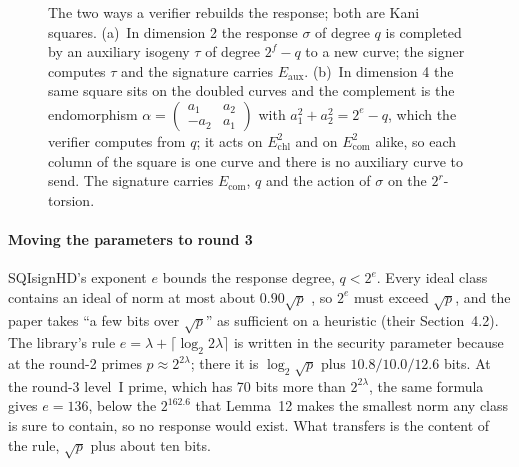 \documentclass[11pt]{article}
\newcommand{\Ecom}{E_{\mathrm{com}}}
\newcommand{\Echl}{E_{\mathrm{chl}}}
\newcommand{\Eaux}{E_{\mathrm{aux}}}
\begin{document}
\begin{figure}[htbp]
\caption{The two ways a verifier rebuilds the response; both are Kani
squares.  (a)~In dimension 2 the response $\sigma$ of degree $q$ is
completed by an auxiliary isogeny $\tau$ of degree $2^f - q$ to a new
curve; the signer computes $\tau$ and the signature carries $\Eaux$.
(b)~In dimension 4 the same square sits on the doubled curves and the
complement is the endomorphism $\alpha = \left(\begin{smallmatrix} a_1 &
a_2 \\ -a_2 & a_1 \end{smallmatrix}\right)$ with $a_1^2 + a_2^2 = 2^e -
q$, which the verifier computes from $q$; it acts on $\Echl^2$ and on
$\Ecom^2$ alike, so each column of the square is one curve and there is
no auxiliary curve to send.  The signature carries $\Ecom$, $q$ and the
action of $\sigma$ on the $2^r$-torsion.}
\label{fig:idea}
\end{figure}

\paragraph{Moving the parameters to round 3}
SQIsignHD's exponent $e$ bounds the response degree, $q < 2^e$.  Every
ideal class contains an ideal of norm at most about $0.90 \sqrt{p}$
\cite[Lemma~12]{DLRW24}, so $2^e$ must exceed $\sqrt{p}$, and the paper
takes ``a few bits over $\sqrt{p}$'' as sufficient on a heuristic
(their Section~4.2).
The library's rule $e = \lambda + \lceil \log_2 2\lambda \rceil$ is
written in the security parameter because at the round-2 primes
$p \approx 2^{2\lambda}$; there it is $\log_2 \sqrt{p}$ plus
$10.8 / 10.0 / 12.6$ bits.  At the round-3 level~I prime, which has 70
bits more than $2^{2\lambda}$, the same formula gives $e = 136$, below the
$2^{162.6}$ that Lemma~12 makes the smallest norm any class is sure to
contain, so no response would exist.  What transfers is the content of
the rule, $\sqrt{p}$ plus about ten bits.
\end{document}
